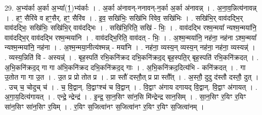 \documentclass[17pt]{extarticle}
\begin{document}
29. अ॒भ्य॑र्का अ॒र्का अ॒भ्या᳚(1॒)भ्य॑र्काः । . अ॒र्का अ॑नावन्-ननावन्-न॒र्का अ॒र्का अ॑नावन्न् । . अ॒ना॒व॒न्नित्य॑नावन्न् । . हꣳ॒॒ सैरि॑वे व हꣳ॒॒सैर्. हꣳ॒॒ सैरि॑व । . इ॒व॒ सखि॑भिः॒ सखि॑भि रिवेव॒ सखि॑भिः । . सखि॑भि॒र् वाव॑दद्भि॒र् वाव॑दद्भिः॒ सखि॑भिः॒ सखि॑भि॒र् वाव॑दद्भिः । . सखि॑भि॒रिति॒ सखि॑ - भिः॒ । . वाव॑दद्भि रश्म॒न्मया᳚ न्यश्म॒न्मया॑नि॒ वाव॑दद्भि॒र् वाव॑दद्भि रश्म॒न्मया॑नि । . वाव॑दद्भि॒रिति॒ वाव॑दत् - भिः॒ । . अ॒श्म॒न्मया॑नि॒ नह॑ना॒ नह॑ना ऽश्म॒न्मया᳚ न्यश्म॒न्मया॑नि॒ नह॑ना । . अ॒श्म॒न्मया॒नीत्य॑श्मन्न् - मया॑नि । . नह॑ना॒ व्यस्य॒न् व्यस्य॒न् नह॑ना॒ नह॑ना॒ व्यस्यन्न्॑ । . व्यस्य॒न्निति॑ वि - अस्यन्न्॑ । . बृह॒स्पति॑ रभि॒कनि॑क्रद दभि॒कनि॑क्रद॒द् बृह॒स्पति॒र् बृह॒स्पति॑ रभि॒कनि॑क्रदत् । . अ॒भि॒कनि॑क्रद॒द् गा गा अ॑भि॒कनि॑क्रद दभि॒कनि॑क्रद॒द् गाः । . अ॒भि॒कनि॑क्रद॒दित्य॑भि - कनि॑क्रदत् । . गा उ॒तोत गा गा उ॒त । . उ॒त प्र प्रो तोत प्र । . प्रा स्तौ॑ दस्तौ॒त् प्र प्रा स्तौ᳚त् । . अ॒स्तौ॒ दुदु द॑स्तौ दस्तौ॒ दुत् । . उच् च॒ चोदुच् च॑ । . च॒ वि॒द्वान्. वि॒द्वाꣳश्च॑ च वि॒द्वान् । . वि॒द्वाꣳ अ॑गाय दगायद् वि॒द्वान्. वि॒द्वाꣳ अ॑गायत् । . अ॒गा॒य॒दित्य॑गायत् । . एन्द्रे॒ न्द्रेन्द्र॑ । . इ॒न्द्र॒ सा॒न॒सिꣳ सा॑न॒सि मि॑न्द्रेन्द्र सान॒सिम् । . सा॒न॒सिꣳ र॒यिꣳ र॒यिꣳ सा॑न॒सिꣳ सा॑न॒सिꣳ र॒यिम् । . र॒यिꣳ स॒जित्वा॑नꣳ स॒जित्वा॑नꣳ र॒यिꣳ र॒यिꣳ स॒जित्वा॑नम् । \newline
\end{document}
